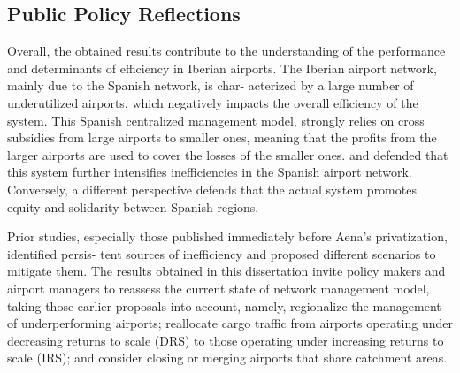 \subsection{Public Policy Reflections}

Overall, the obtained results contribute to the understanding of the performance and determinants of
efficiency in Iberian airports. The Iberian airport network, mainly due to the Spanish network, is char-
acterized by a large number of underutilized airports, which negatively impacts the overall efficiency of
the system. This Spanish centralized management model, strongly relies on cross subsidies from large
airports to smaller ones, meaning that the profits from the larger airports are used to cover the losses
of the smaller ones. \cite{martin2001} and \cite{nerja2021} defended that this system further intensifies inefficiencies in the Spanish airport network. Conversely,
a different perspective defends that the actual system promotes equity and solidarity between Spanish
regions.

Prior studies, especially those published immediately before Aena’s privatization, identified persis-
tent sources of inefficiency and proposed different scenarios to mitigate them. The results obtained
in this dissertation invite policy makers and airport managers to reassess the current state of network
management model, taking those earlier proposals into account, namely, regionalize the management of underperforming airports; reallocate cargo traffic from airports operating under decreasing returns to
scale (DRS) to those operating under increasing returns to scale (IRS); and consider closing or merging airports that share catchment areas.


